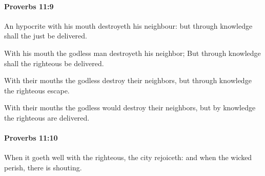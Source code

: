 		\paragraph{Proverbs 11:9} %
			\label{PROVERBS-11-9}

			An hypocrite with his mouth destroyeth his neighbour: but through knowledge shall the just be delivered.

			\begin{versebox}
					\item[BHS] 
					\item[ASV] With his mouth the godless man destroyeth his neighbor; But through knowledge shall the righteous be delivered.
					\item[NIV] With their mouths the godless destroy their neighbors, but through knowledge the righteous escape.
					\item[NRSV] With their mouths the godless would destroy their neighbors, but by knowledge the righteous are delivered.
			\end{versebox}

		\paragraph{Proverbs 11:10} %
			\label{PROVERBS-11-10}

			When it goeth well with the righteous, the city rejoiceth: and when the wicked perish, there is shouting.

